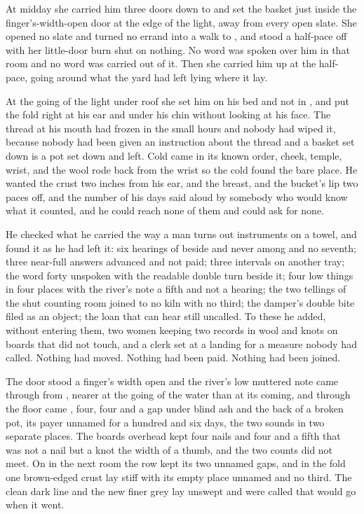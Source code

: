 At midday she carried him three doors down to  and set the basket just inside the finger's-width-open door at the edge of the light, away from every open slate. She opened no slate and turned no errand into a walk to , and stood a half-pace off with her little-door burn shut on nothing. No word was spoken over him in that room and no word was carried out of it. Then she carried him up  at the half-pace, going around what the yard had left lying where it lay.

\scenebreak

At the going of the light under  roof she set him on his bed and not in , and put the fold right at his ear and under his chin without looking at his face. The thread at his mouth had frozen in the small hours and nobody had wiped it, because nobody had been given an instruction about the thread and a basket set down is a pot set down and left. Cold came in its known order, cheek, temple, wrist, and the wool rode back from the wrist so the cold found the bare place. He wanted the crust two inches from his ear, and the breast, and the bucket's lip two paces off, and the number of his days said aloud by somebody who would know what it counted, and he could reach none of them and could ask for none.

He checked what he carried the way a man turns out instruments on a towel, and found it as he had left it: six hearings of  beside and never among and no seventh; three near-full answers advanced and not paid; three intervals on another tray; the word forty unspoken with the readable double turn beside it; four low things in four places with the river's note a fifth and not a hearing; the two tellings of the shut counting room joined to no kiln with no third; the damper's double bite filed as an object; the loan that can hear still uncalled. To these he added, without entering them, two women keeping two records in wool and knots on boards that did not touch, and a clerk set at a landing for a measure nobody had called. Nothing had moved. Nothing had been paid. Nothing had been joined.

The door stood a finger's width open and the river's low muttered note came through from , nearer at the going of the water than at its coming, and through the floor came , four, four and a gap under blind ash and the back of a broken pot, its payer unnamed for a hundred and six days, the two sounds in two separate places. The boards overhead kept four nails and four and a fifth that was not a nail but a knot the width of a thumb, and the two counts did not meet. On  in the next room the row kept its two unnamed gaps, and in the fold one brown-edged crust lay stiff with its empty place unnamed and no third. The clean dark line and the new finer grey lay unswept and were called  that would go when it went.

